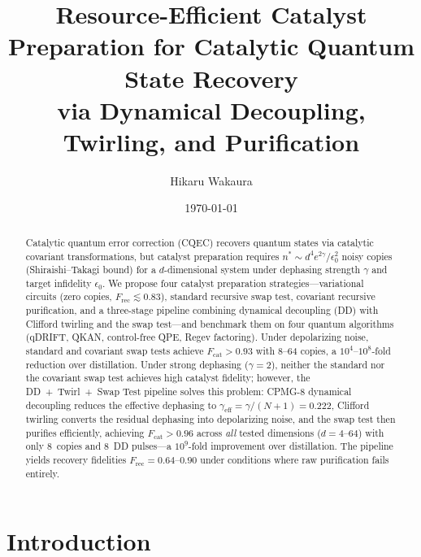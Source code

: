 \documentclass[prx,twocolumn,superscriptaddress,longbibliography,floatfix]{revtex4-2}
\begin{document}
\title{Resource-Efficient Catalyst Preparation for Catalytic Quantum State Recovery\\via Dynamical Decoupling, Twirling, and Purification}

\author{Hikaru Wakaura}

\date{\today}
 
\begin{abstract}
Catalytic quantum error correction (CQEC) recovers quantum states via catalytic covariant transformations, but catalyst preparation requires $n^* \sim d^4 e^{2\gamma}/\epsilon_0^2$ noisy copies (Shiraishi--Takagi bound) for a $d$-dimensional system under dephasing strength $\gamma$ and target infidelity $\epsilon_0$. 
We propose four catalyst preparation strategies---variational circuits (zero copies, $F_\mathrm{rec} \lesssim 0.83$), standard recursive swap test, covariant recursive purification, and a three-stage pipeline combining dynamical decoupling (DD) with Clifford twirling and the swap test---and benchmark them on four quantum algorithms (qDRIFT, QKAN, control-free QPE, Regev factoring).
Under depolarizing noise, standard and covariant swap tests achieve $F_\mathrm{cat} > 0.93$ with 8--64 copies, a $10^4$--$10^8$-fold reduction over distillation.
Under strong dephasing ($\gamma = 2$), neither the standard nor the covariant swap test achieves high catalyst fidelity; however, the DD~+~Twirl~+~Swap Test pipeline solves this problem: CPMG-8 dynamical decoupling reduces the effective dephasing to $\gamma_\mathrm{eff} = \gamma/(N+1) = 0.222$, Clifford twirling converts the residual dephasing into depolarizing noise, and the swap test then purifies efficiently, achieving $F_\mathrm{cat} > 0.96$ across \emph{all} tested dimensions ($d = 4$--$64$) with only 8~copies and 8~DD pulses---a $10^9$-fold improvement over distillation.
The pipeline yields recovery fidelities $F_\mathrm{rec} = 0.64$--$0.90$ under conditions where raw purification fails entirely.
\end{abstract}

\maketitle


\section{Introduction}
\label{sec:intro}
\end{document}
